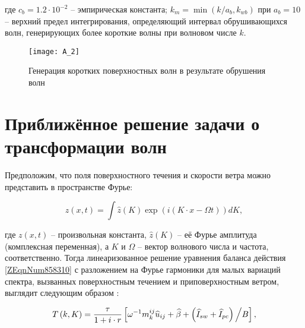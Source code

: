 \noindent где $c_{b} =1.2\cdot 10^{-2} $ -- эмпирическая константа; $k_{m} =\min (k/a_{b} ,k_{wb} )$ при $a_{b} =10$ -- верхний предел интегрирования, определяющий интервал обрушивающихся волн, генерирующих более короткие волны при волновом числе $k$. 



\begin{figure}[H]
    \texttt{[image: A\_2]}
    \caption{Генерация коротких поверхностных волн в результате обрушения волн}
    \label{fig:A.2}
\end{figure}


\section{Приближённое решение задачи о трансформации волн} \label{AppendixA1}

Предположим, что поля поверхностного течения и скорости ветра можно представить в пространстве Фурье:



\begin{equation} \label{1.36)} z\left(x,t\right)=\int \widehat{z}\left(K\right) \exp \left(i\left(K\cdot x-\Omega t\right)\right)dK,  \end{equation} 



\noindent где $z\left(x,t\right)$ -- произвольная константа, $\widehat{z}\left(K\right)$ -- её Фурье амплитуда (комплексная переменная), а $K$ и $\Omega $ -- вектор волнового числа и частота, соответственно. Тогда линеаризованное решение уравнения баланса действия \eqref{ZEqnNum858310} с разложением на Фурье гармоники для малых вариаций спектра, вызванных поверхностным течением и приповерхностным ветром, выглядит следующим образом \citep{Kudryavtsev2005}:



\begin{equation} \label{1.37)} T\left(k,K\right)=\frac{\tau }{1+i\cdot r} \left[\omega ^{-1} m_{k}^{ij} \widehat{u}_{ij} +\widehat{\beta }+{\left(\widehat{I}_{sw} +\widehat{I}_{pc} \right)\mathord{\left/ {\vphantom {\left(\widehat{I}_{sw} +\widehat{I}_{pc} \right) B}} \right. \kern-\nulldelimiterspace} B} \right],  \end{equation} 



